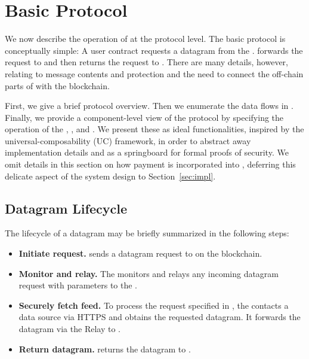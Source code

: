 

\section{Basic \tc Protocol}
\label{sec:protocols}
We now describe the operation of \tc at the protocol level. The basic protocol is conceptually simple: A user contract \reqcont requests a datagram from the \tcontract \tcont. \tcont forwards the request to \engine and then returns the request to \reqcont. There are many details, however, relating to message contents and protection and the need to connect the off-chain parts of \tc with the blockchain.

First, we give a brief protocol overview. Then we enumerate the data flows in \tc. Finally, we provide a component-level view of the protocol by specifying the operation of the \tcontract, \medname, and \encname. We present these  as ideal functionalities, inspired by the universal-composability (UC) framework, in order to abstract away implementation details and as a springboard for formal proofs of security. We omit details in this section on how payment is incorporated into \tc, deferring this delicate aspect of the system design to Section~\ref{sec:impl}.

\subsection{Datagram Lifecycle}

The lifecycle of a datagram may be briefly summarized in the following steps:

\vspace{-2mm}
\begin{itemize}
  \setlength{\itemsep}{2pt}
  \setlength{\parskip}{0pt}
  \setlength{\parsep}{0pt}
\item {\bf Initiate request.} \reqcont sends a datagram request to \tcont on the blockchain.

\item {\bf Monitor and relay.} The \medname monitors \tcont and relays any incoming datagram request with parameters \dgform to the \encname.

\item {\bf Securely fetch feed.} To process the request specified in \dgform, the \encname contacts a data source via HTTPS and obtains the requested datagram. It forwards the datagram via the Relay to \tcont.

\item {\bf Return datagram.} \tcont returns the datagram to \reqcont.
\end{itemize}
\vspace{-2mm}

